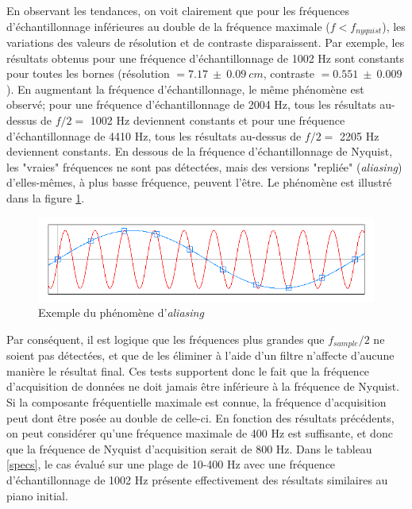 ﻿\documentclass[11pt,letterpaper]{article}
\begin{document}
En observant les tendances, on voit clairement que pour les fréquences d'échantillonnage inférieures au double
de la fréquence maximale ($f<f_{nyquist}$), les variations des valeurs de résolution et de contraste disparaissent. Par exemple,
les résultats obtenus pour une fréquence d'échantillonnage de 1002 Hz sont constants pour toutes les bornes (résolution $=7.17\ \pm \ 0.09\ cm$,
contraste $=0.551\ \pm\ 0.009$). En augmentant la fréquence d'échantillonnage, le même phénomène est observé; pour une fréquence d'échantillonnage de 
2004 Hz, tous les résultats au-dessus de $f/2=$ 1002 Hz deviennent constants et pour une fréquence d'échantillonnage de 4410 Hz, tous les résultats au-dessus de
$f/2=$ 2205 Hz deviennent constants. En dessous de la fréquence d'échantillonnage de Nyquist, les "vraies" fréquences ne sont pas détectées, mais des versions "repliée"
(\textit{aliasing}) d'elles-mêmes, à plus basse fréquence, peuvent l'être. Le phénomène est illustré dans la figure \ref{aliasing}. 
\begin{figure}[H]
    \centering
    \includegraphics[scale=0.5]{Aliasing-plot.png}
    \caption{Exemple du phénomène d'\textit{aliasing} \cite{nyquist}}
    \label{aliasing}
\end{figure}

Par conséquent, il est logique que les fréquences plus grandes que $f_{sample}/2$ ne soient pas détectées, et que 
de les éliminer  à l'aide d'un filtre n'affecte d'aucune manière le résultat final. Ces tests supportent donc le fait que la fréquence 
d'acquisition de données ne doit jamais être inférieure à la fréquence de Nyquist. Si la composante fréquentielle maximale est 
connue, la fréquence d'acquisition peut dont être posée au double de celle-ci. En fonction des résultats précédents, on peut considérer
qu'une fréquence maximale de 400 Hz est suffisante, et donc que la fréquence de Nyquist d'acquisition serait de 800 Hz. Dans le tableau
\ref{specs}, le cas évalué sur une plage de 10-400 Hz avec une fréquence d'échantillonnage de 1002 Hz présente effectivement des résultats similaires au piano
initial.
\end{document}
